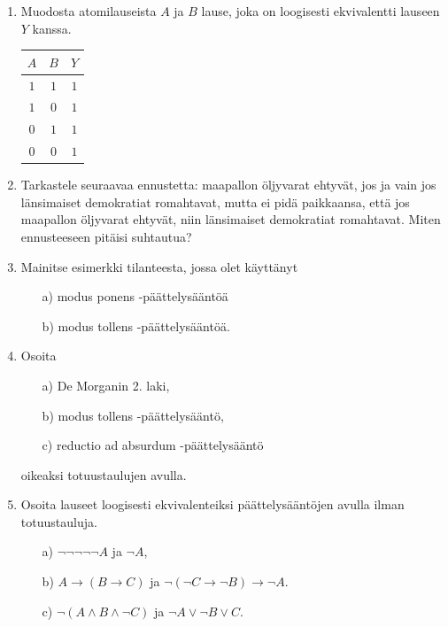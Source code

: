 \begin{enumerate}
\item Muodosta atomilauseista $A$ ja $B$ lause, joka on
loogisesti ekvivalentti lauseen $Y$ kanssa.
\begin{center}
\begin{tabular}{|c|c|c|}\hline
$A$ & $B$ & $Y$\\ \hline
$1$ & $1$ & $1$\\
$1$ & $0$ & $1$\\
$0$ & $1$ & $1$\\

$0$ & $0$ & $1$\\ \hline
\end{tabular}
\end{center}

\item Tarkastele seuraavaa ennustetta: maapallon öljyvarat ehtyvät, jos ja vain jos länsimaiset demokratiat romahtavat, mutta ei pidä paikkaansa, että jos maapallon
öljyvarat ehtyvät, niin länsimaiset demokratiat romahtavat. Miten ennusteeseen pitäisi suhtautua?

\item Mainitse esimerkki tilanteesta, jossa olet käyttänyt
\begin{itemize}
\item[a)] modus ponens -päättelysääntöä
\item[b)] modus tollens -päättelysääntöä.
\end{itemize}

\item Osoita
\begin{itemize}
\item[a)] De Morganin 2. laki,
\item[b)] modus tollens -päättelysääntö,
\item[c)] reductio ad absurdum -päättelysääntö
\end{itemize}
oikeaksi totuustaulujen avulla.

\item Osoita lauseet loogisesti ekvivalenteiksi
päättelysääntöjen avulla ilman totuustauluja.
\begin{itemize}
\item[a)] $\lnot \lnot \lnot \lnot \lnot A$ ja $\lnot A$,
\item[b)] $A \to (B \to C)$ ja $\lnot (\lnot C \to \lnot
B) \to \lnot A$.
\item[c)] $\lnot (A \land B \land \lnot C)$ ja $\lnot A
\lor \lnot B \lor C$.
\end{itemize}


\end{enumerate}
